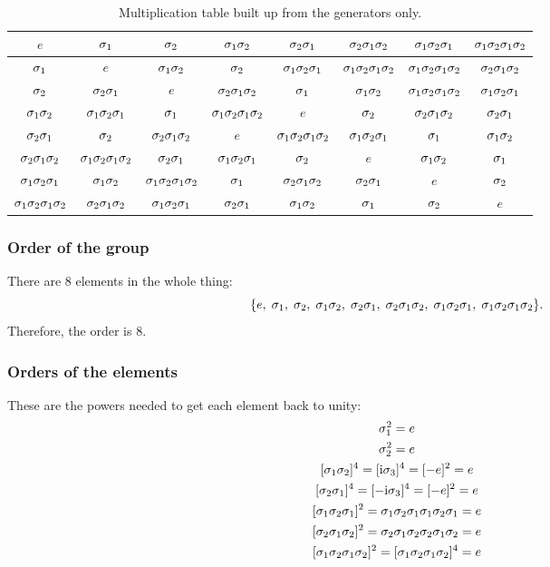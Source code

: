 \documentclass[11pt, english, fleqn, DIV=15, headinclude, BCOR=1cm]{scrartcl}
\begin{document}
\begin{landscape}
    \begin{table}[p]
        \centering
        \begin{tabular}{c|ccccccc}
            $e$ & $\1$ & $\2$ & $\1\2$ & $\2\1$ & $\2\1\2$ & $\1\2\1$ & $\1\2\1\2$ \\
            \midrule
            $\1$ & $e$ & $\1\2$ & $\2$ & $\1\2\1$ & $\1\2\1\2$ & $\1\2\1\2$ & $\2\1\2$ \\
            $\2$ & $\2\1$ & $e$ & $\2\1\2$ & $\1$ & $\1\2$ & $\1\2\1\2$ & $\1\2\1$ \\
            $\1\2$ & $\1\2\1$ & $\1$ & $\1\2\1\2$ & $e$ & $\2$ & $\2\1\2$ & $\2\1$ \\
            $\2\1$ & $\2$ & $\2\1\2$ & $e$ & $\1\2\1\2$ & $\1\2\1$ & $\1$ & $\1\2$ \\
            $\2\1\2$ & $\1\2\1\2$ & $\2\1$ & $\1\2\1$ & $\2$ & $e$ & $\1\2$ & $\1$ \\
            $\1\2\1$ & $\1\2$ & $\1\2\1\2$ & $\1$ & $\2\1\2$ & $\2\1$ & $e$ & $\2$ \\
            $\1\2\1\2$ & $\2\1\2$ & $\1\2\1$ & $\2\1$ & $\1\2$ & $\1$ & $\2$ & $e$ \\
        \end{tabular}
        \caption{%
            Multiplication table built up from the generators only.
        }
        \label{tab:generators}
    \end{table}
\end{landscape}

\subsubsection{Order of the group}

There are 8 elements in the whole thing:
\[
    \{ e\ssep \1\ssep \2\ssep \1\2\ssep \2\1\ssep \2\1\2\ssep \1\2\1\ssep \1\2\1\2 \}.
\]
Therefore, the order is 8.

\subsubsection{Orders of the elements}

These are the powers needed to get each element back to unity:
\begin{gather*}
    \1^2 = e \\
    \2^2 = e \\
    [\1\2]^4 = [\iup \3]^4 = [-e]^2 = e \\
    [\2\1]^4 = [-\iup \3]^4 = [-e]^2 = e \\
    [\1\2\1]^2 = \1\2\1 \1\2\1 = e \\
    [\2\1\2]^2 = \2\1\2 \2\1\2 = e \\
    [\1\2\1\2]^2 = [\1\2\1\2]^4 = e
\end{gather*}
\end{document}
